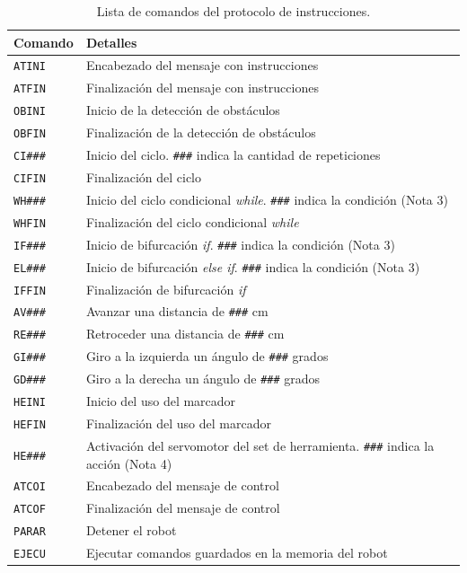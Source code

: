 \documentclass[12pt,a4paper]{article}
\begin{document}
\begin{table}[H]
    \centering
    \renewcommand{\arraystretch}{1.15}
    \begin{tabularx}{\textwidth}{@{} l X @{}}
        \toprule
        \textbf{Comando} & \textbf{Detalles} \\
        \midrule
        \texttt{ATINI} & Encabezado del mensaje con instrucciones \\
        \texttt{ATFIN} & Finalización del mensaje con instrucciones \\
        \texttt{OBINI} & Inicio de la detección de obstáculos \\
        \texttt{OBFIN} & Finalización de la detección de obstáculos \\
        \texttt{CI\#\#\#} & Inicio del ciclo. \texttt{\#\#\#} indica la cantidad de repeticiones \\
        \texttt{CIFIN} & Finalización del ciclo \\
        \texttt{WH\#\#\#} & Inicio del ciclo condicional \textit{while}. \texttt{\#\#\#} indica la condición (Nota 3) \\
        \texttt{WHFIN} & Finalización del ciclo condicional \textit{while} \\
        \texttt{IF\#\#\#} & Inicio de bifurcación \textit{if}. \texttt{\#\#\#} indica la condición (Nota 3) \\
        \texttt{EL\#\#\#} & Inicio de bifurcación \textit{else if}. \texttt{\#\#\#} indica la condición (Nota 3) \\
        \texttt{IFFIN} & Finalización de bifurcación \textit{if} \\
        \texttt{AV\#\#\#} & Avanzar una distancia de \texttt{\#\#\#} cm \\
        \texttt{RE\#\#\#} & Retroceder una distancia de \texttt{\#\#\#} cm \\
        \texttt{GI\#\#\#} & Giro a la izquierda un ángulo de \texttt{\#\#\#} grados \\
        \texttt{GD\#\#\#} & Giro a la derecha un ángulo de \texttt{\#\#\#} grados \\
        \texttt{HEINI} & Inicio del uso del marcador \\
        \texttt{HEFIN} & Finalización del uso del marcador \\
        \texttt{HE\#\#\#} & Activación del servomotor del set de herramienta. \texttt{\#\#\#} indica la acción (Nota 4) \\
        \texttt{ATCOI} & Encabezado del mensaje de control \\
        \texttt{ATCOF} & Finalización del mensaje de control \\
        \texttt{PARAR} & Detener el robot \\
        \texttt{EJECU} & Ejecutar comandos guardados en la memoria del robot \\
        \bottomrule
    \end{tabularx}
    \caption{Lista de comandos del protocolo de instrucciones.}
\end{table}
\end{document}
